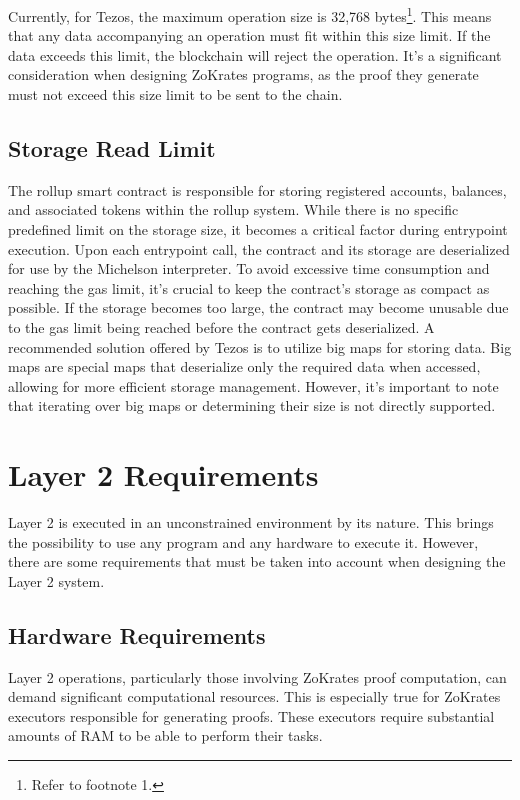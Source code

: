 Currently, for Tezos, the maximum operation size is 32,768 bytes\footnote{Refer to footnote 1.}. This means that any data accompanying an operation must fit within this size limit. If the data exceeds this limit, the blockchain will reject the operation. It's a significant consideration when designing ZoKrates programs, as the proof they generate must not exceed this size limit to be sent to the chain.

\subsection{Storage Read Limit}

The rollup smart contract is responsible for storing registered accounts, balances, and associated tokens within the rollup system. While there is no specific predefined limit on the storage size, it becomes a critical factor during entrypoint execution. Upon each entrypoint call, the contract and its storage are deserialized for use by the Michelson interpreter. To avoid excessive time consumption and reaching the gas limit, it's crucial to keep the contract's storage as compact as possible. If the storage becomes too large, the contract may become unusable due to the gas limit being reached before the contract gets deserialized. A recommended solution offered by Tezos is to utilize big maps for storing data. Big maps are special maps that deserialize only the required data when accessed, allowing for more efficient storage management. However, it's important to note that iterating over big maps or determining their size is not directly supported.

\section{Layer 2 Requirements}

Layer 2 is executed in an unconstrained environment by its nature. This brings the possibility to use any program and any hardware to execute it. However, there are some requirements that must be taken into account when designing the Layer 2 system.

\subsection{Hardware Requirements}

Layer 2 operations, particularly those involving ZoKrates proof computation, can demand significant computational resources. This is especially true for ZoKrates executors responsible for generating proofs. These executors require substantial amounts of RAM to be able to perform their tasks.

